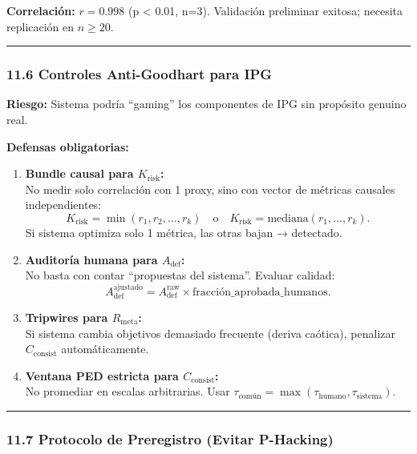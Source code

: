 \textbf{Correlación:} \(r = 0.998\) (p \textless{} 0.01, n=3).
Validación preliminar exitosa; necesita replicación en \(n \geq 20\).

\begin{center}\rule{0.5\linewidth}{0.5pt}\end{center}

\subsubsection{11.6 Controles Anti-Goodhart para
IPG}\label{controles-anti-goodhart-para-ipg}

\textbf{Riesgo:} Sistema podría ``gaming'' los componentes de IPG sin
propósito genuino real.

\textbf{Defensas obligatorias:}

\begin{enumerate}
\def\labelenumi{\arabic{enumi}.}
\item
  \textbf{Bundle causal para \(K_{\text{risk}}\):}\\
  No medir solo correlación con 1 proxy, sino con vector de métricas
  causales independientes: \[
  K_{\text{risk}} = \min(r_1, r_2, \ldots, r_k) \quad \text{o} \quad K_{\text{risk}} = \text{mediana}(r_1, \ldots, r_k).
  \] Si sistema optimiza solo 1 métrica, las otras bajan → detectado.
\item
  \textbf{Auditoría humana para \(A_{\text{def}}\):}\\
  No basta con contar ``propuestas del sistema''. Evaluar calidad: \[
  A_{\text{def}}^{\text{ajustado}} = A_{\text{def}}^{\text{raw}} \times \text{fracción\_aprobada\_humanos}.
  \]
\item
  \textbf{Tripwires para \(R_{\text{meta}}\):}\\
  Si sistema cambia objetivos demasiado frecuente (deriva caótica),
  penalizar \(C_{\text{consist}}\) automáticamente.
\item
  \textbf{Ventana PED estricta para \(C_{\text{consist}}\):}\\
  No promediar en escalas arbitrarias. Usar
  \(\tau_{\text{común}} = \max(\tau_{\text{humano}}, \tau_{\text{sistema}})\).
\end{enumerate}

\begin{center}\rule{0.5\linewidth}{0.5pt}\end{center}

\subsubsection{11.7 Protocolo de Preregistro (Evitar
P-Hacking)}\label{protocolo-de-preregistro-evitar-p-hacking}


